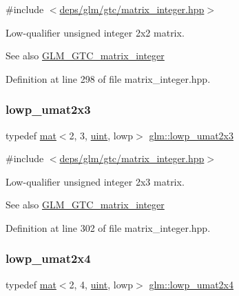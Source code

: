 {\ttfamily \#include $<$\hyperlink{matrix__integer_8hpp}{deps/glm/gtc/matrix\+\_\+integer.\+hpp}$>$}

Low-\/qualifier unsigned integer 2x2 matrix. \begin{DoxySeeAlso}{See also}
\hyperlink{group__gtc__matrix__integer}{G\+L\+M\+\_\+\+G\+T\+C\+\_\+matrix\+\_\+integer} 
\end{DoxySeeAlso}


Definition at line 298 of file matrix\+\_\+integer.\+hpp.

\mbox{\label{group__gtc__matrix__integer_gafd5d32892f45c112f974b8d91fc4e25a}} 
\subsubsection{\texorpdfstring{lowp\+\_\+umat2x3}{lowp\_umat2x3}}
{\footnotesize\ttfamily typedef \hyperlink{structglm_1_1mat}{mat}$<$2, 3, \hyperlink{group__core__precision_ga4fd29415871152bfb5abd588334147c8}{uint}, lowp$>$ \hyperlink{group__gtc__matrix__integer_gafd5d32892f45c112f974b8d91fc4e25a}{glm\+::lowp\+\_\+umat2x3}}



{\ttfamily \#include $<$\hyperlink{matrix__integer_8hpp}{deps/glm/gtc/matrix\+\_\+integer.\+hpp}$>$}

Low-\/qualifier unsigned integer 2x3 matrix. \begin{DoxySeeAlso}{See also}
\hyperlink{group__gtc__matrix__integer}{G\+L\+M\+\_\+\+G\+T\+C\+\_\+matrix\+\_\+integer} 
\end{DoxySeeAlso}


Definition at line 302 of file matrix\+\_\+integer.\+hpp.

\mbox{\label{group__gtc__matrix__integer_ga5676b5ed80e507b06b1ac9210a7098df}} 
\subsubsection{\texorpdfstring{lowp\+\_\+umat2x4}{lowp\_umat2x4}}
{\footnotesize\ttfamily typedef \hyperlink{structglm_1_1mat}{mat}$<$2, 4, \hyperlink{group__core__precision_ga4fd29415871152bfb5abd588334147c8}{uint}, lowp$>$ \hyperlink{group__gtc__matrix__integer_ga5676b5ed80e507b06b1ac9210a7098df}{glm\+::lowp\+\_\+umat2x4}}



